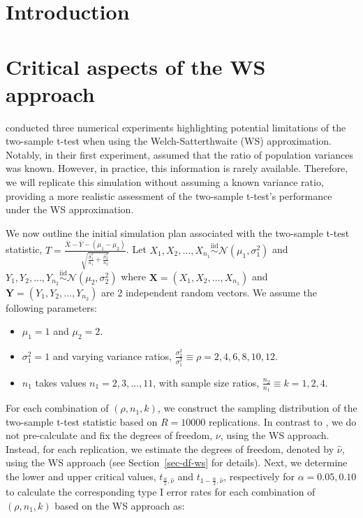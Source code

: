 \documentclass[
  12pt]{article}
\providecommand{\tightlist}{%
  \setlength{\itemsep}{0pt}\setlength{\parskip}{0pt}}\usepackage{longtable,booktabs,array}
\begin{document}
\section{Introduction}\label{sec-intro}

\section{Critical aspects of the WS
approach}\label{critical-aspects-of-the-ws-approach}

\citet{lloyd_2-sample_2013} conducted three numerical experiments
highlighting potential limitations of the two-sample t-test when using
the Welch-Satterthwaite (WS) approximation. Notably, in their first
experiment, \citet{lloyd_2-sample_2013} assumed that the ratio of
population variances was known. However, in practice, this information
is rarely available. Therefore, we will replicate this simulation
without assuming a known variance ratio, providing a more realistic
assessment of the two-sample t-test's performance under the WS
approximation.

We now outline the initial simulation plan associated with the
two-sample t-test statistic,
\(T = \frac{\overline{X} - \overline{Y} - (\mu_1 - \mu_2)}{\sqrt{\frac{\widehat{\sigma}^2_1}{n_1} + \frac{\widehat{\sigma}^2_2}{n_2}}}\).
Let
\(X_1, X_2, \ldots, X_{n_1} \overset{\text{iid}}{\sim} \mathcal{N}(\mu_1, \sigma_1^2)\)
and
\(Y_1, Y_2, \ldots, Y_{n_2} \overset{\text{iid}}{\sim} \mathcal{N}(\mu_2, \sigma_2^2)\)
where \(\mathbf{X} = (X_1, X_2, \ldots, X_{n_1})\) and
\(\mathbf{Y} = (Y_1, Y_2, \ldots, Y_{n_2})\) are 2 independent random
vectors. We assume the following parameters:

\begin{itemize}
\tightlist
\item
  \(\mu_1 = 1\) and \(\mu_2 = 2\).
\item
  \(\sigma^2_1 = 1\) and varying variance ratios,
  \(\frac{\sigma^2_2}{\sigma^2_1} \equiv \rho = 2, 4, 6, 8, 10, 12\).
\item
  \(n_1\) takes values \(n_1 = 2, 3, \ldots, 11\), with sample size
  ratios, \(\frac{n_2}{n_1} \equiv k = 1, 2, 4\).
\end{itemize}

For each combination of \((\rho, n_1, k)\), we construct the sampling
distribution of the two-sample t-test statistic based on \(R = 10000\)
replications. In contrast to \citet{lloyd_2-sample_2013}, we do not
pre-calculate and fix the degrees of freedom, \(\nu\), using the WS
approach. Instead, for each replication, we estimate the degrees of
freedom, denoted by \(\widehat{\nu}\), using the WS approach (see
Section~\ref{sec-df-ws} for details). Next, we determine the lower and
upper critical values, \(t_{\frac{\alpha}{2},\widehat{\nu}}\) and
\(t_{1-\frac{\alpha}{2},\widehat{\nu}}\), respectively for
\(\alpha = 0.05, 0.10\) to calculate the corresponding type I error
rates for each combination of \((\rho, n_1, k)\) based on the WS
approach as:
\end{document}

